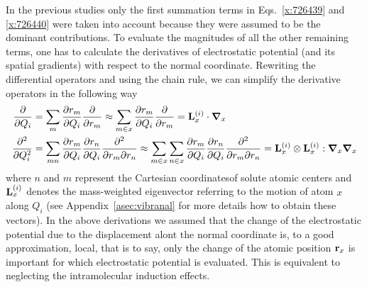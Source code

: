 \documentclass[a4paper,titlepage,twoside,fleqn,12pt]{book}
\newcommand{\BM}[1]{\ensuremath{\mbox{\boldmath${#1}$}}}
\newcommand{\fderiv}[2]{\ensuremath{
\frac{\partial #1}{\partial #2}}}
\newcommand{\sderiv}[2]{\ensuremath{
\frac{\partial^2 #1}{\partial #2^2}
}}
\newcommand{\sderivd}[3]{\ensuremath{
\frac{\partial^2 #1}{\partial #2 \partial #3}
}}
\begin{document}
\begin{refsection}
In the previous studies only the first summation terms in 
Eqs.~\eqref{x:726439} and \eqref{x:726440} were taken into account because 
they were assumed to be the dominant contributions. To evaluate the
magnitudes of all the other remaining terms, one has to calculate
the derivatives of electrostatic potential (and its spatial gradients)
with respect to the normal coordinate. Rewriting the differential 
operators and using the chain rule, we can simplify the
derivative operators in the following way
%
\begin{subequations}  \label{e:deriv-operators}
\begin{align}
\fderiv{}{Q_i} &= \sum_m \fderiv{r_m}{Q_i}\fderiv{}{r_m} 
     \approx \sum_{m\in x} \fderiv{r_m}{Q_i}\fderiv{}{r_m} 
     = {\bf L}_x^{(i)} \cdot {\BM \nabla}_x      \label{e:deriv-operators-1} \\
\sderiv{}{Q_i} &= \sum_{mn} \fderiv{r_m}{Q_i}\fderiv{r_n}{Q_i}\sderivd{}{r_m}{r_n} 
     \approx \sum_{m\in x}\sum_{n\in x} \fderiv{r_m}{Q_i}\fderiv{r_n}{Q_i}\sderivd{}{r_m}{r_n} 
     = {\bf L}_x^{(i)} \otimes {\bf L}_x^{(i)} : {\BM \nabla}_x{\BM \nabla}_x  \label{e:deriv-operators-2}
\end{align}
\end{subequations}
%
where $n$ and $m$ represent the Cartesian coordinatesof solute
atomic centers and ${\bf L}_x^{(i)}$ denotes the mass\hyp{}weighted
eigenvector referring to the motion of atom $x$ along $Q_i$
(see Appendix~\ref{asec:vibranal} for more details how to obtain these vectors).
In the above derivations we assumed that the change of the electrostatic
potential due to the displacement alont the normal coordinate is, 
to a good approximation, local, that is to say, only the change of the
atomic position ${\bf r}_x$ is important for which electrostatic potential 
is evaluated. This is equivalent to neglecting the intramolecular induction
effects.


\end{refsection}
\end{document}
